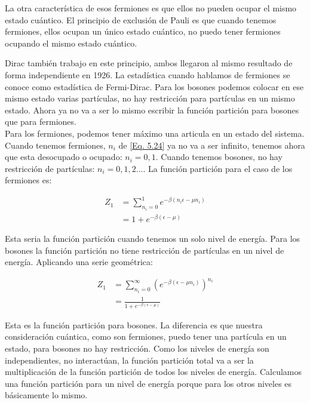 \documentclass[11pt,fleqn]{book}
\begin{document}
La otra característica de esos fermiones es que ellos no pueden ocupar el mismo estado cuántico. El principio de exclusión de Pauli es que cuando tenemos fermiones, ellos ocupan un único estado cuántico, no puedo tener fermiones ocupando el mismo estado cuántico.



Dirac también trabajo en este principio, ambos llegaron al mismo resultado de forma independiente en 1926. La estadística cuando hablamos de fermiones se conoce como estadística de Fermi-Dirac. Para los bosones podemos colocar en ese mismo estado varias partículas, no hay restricción para partículas en un mismo estado. Ahora ya no va a ser lo mismo escribir la función partición para bosones que para fermiones.\\

Para los fermiones, podemos tener máximo una articula en un estado del sistema. Cuando tenemos fermiones, $n_{i}$ de \ref{Eq. 5.24} ya no va a ser infinito, tenemos ahora que esta desocupado o ocupado: $n_{i}=0, 1$.  Cuando tenemos bosones, no hay restricción de partículas: $n_{i}=0, 1, 2...$.  La función partición para el caso de los fermiones es:

\begin{equation}\begin{split}
    Z_{1}&=\sum_{n_{i}=0}^{1}e^{-\beta(n_{i}\epsilon-\mu n_{i})}\\
    &=1+e^{-\beta(\epsilon-\mu)}
\end{split}
\label{Eq. 5.25}
\end{equation}
 
Esta seria la función partición cuando tenemos un solo nivel de energía. Para los bosones la función partición no tiene restricción de partículas en un nivel de energía. Aplicando una serie geométrica:

\begin{equation}\begin{split}
    Z_{1}&=\sum_{n_{i}=0}^{\infty}\left(e^{-\beta(\epsilon-\mu n_{i})}\right)^{n_{i}}\\
    &=\frac{1}{1+e^{-\beta(\epsilon-\mu)}}
\end{split}
\label{Eq. 5.26}
\end{equation}

Esta es la función partición para bosones. La diferencia es que nuestra consideración cuántica, como son fermiones, puedo tener una partícula en un estado, para bosones no hay restricción. Como los niveles de energía son independientes, no interactúan,  la función partición total va a ser la multiplicación de la función partición de todos los niveles de energía. Calculamos una función partición para un nivel de energía porque para los otros niveles es básicamente lo mismo. \\
\end{document}
